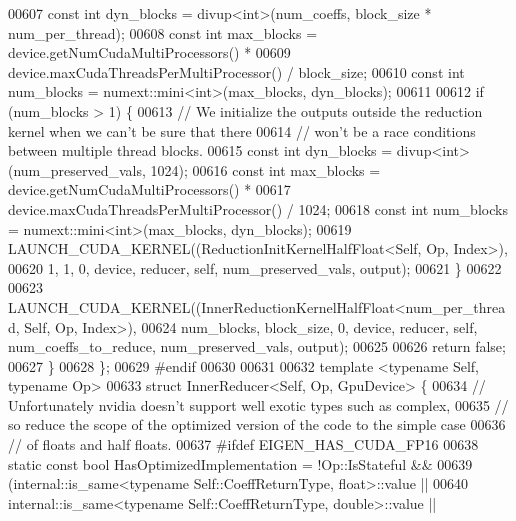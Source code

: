 \begin{DoxyCode}
00607     \textcolor{keyword}{const} \textcolor{keywordtype}{int} dyn\_blocks = divup<int>(num\_coeffs, block\_size * num\_per\_thread);
00608     \textcolor{keyword}{const} \textcolor{keywordtype}{int} max\_blocks = device.getNumCudaMultiProcessors() *
00609                            device.maxCudaThreadsPerMultiProcessor() / block\_size;
00610     \textcolor{keyword}{const} \textcolor{keywordtype}{int} num\_blocks = numext::mini<int>(max\_blocks, dyn\_blocks);
00611 
00612     \textcolor{keywordflow}{if} (num\_blocks > 1) \{
00613       \textcolor{comment}{// We initialize the outputs outside the reduction kernel when we can't be sure that there}
00614       \textcolor{comment}{// won't be a race conditions between multiple thread blocks.}
00615       \textcolor{keyword}{const} \textcolor{keywordtype}{int} dyn\_blocks = divup<int>(num\_preserved\_vals, 1024);
00616       \textcolor{keyword}{const} \textcolor{keywordtype}{int} max\_blocks = device.getNumCudaMultiProcessors() *
00617                            device.maxCudaThreadsPerMultiProcessor() / 1024;
00618       \textcolor{keyword}{const} \textcolor{keywordtype}{int} num\_blocks = numext::mini<int>(max\_blocks, dyn\_blocks);
00619       LAUNCH\_CUDA\_KERNEL((ReductionInitKernelHalfFloat<Self, Op, Index>),
00620                          1, 1, 0, device, reducer, \textcolor{keyword}{self}, num\_preserved\_vals, output);
00621     \}
00622 
00623     LAUNCH\_CUDA\_KERNEL((InnerReductionKernelHalfFloat<num\_per\_thread, Self, Op, Index>),
00624                        num\_blocks, block\_size, 0, device, reducer, \textcolor{keyword}{self}, num\_coeffs\_to\_reduce, 
      num\_preserved\_vals, output);
00625 
00626     \textcolor{keywordflow}{return} \textcolor{keyword}{false};
00627   \}
00628 \};
00629 \textcolor{preprocessor}{#endif}
00630 
00631 
00632 \textcolor{keyword}{template} <\textcolor{keyword}{typename} Self, \textcolor{keyword}{typename} Op>
00633 \textcolor{keyword}{struct }InnerReducer<Self, Op, GpuDevice> \{
00634   \textcolor{comment}{// Unfortunately nvidia doesn't support well exotic types such as complex,}
00635   \textcolor{comment}{// so reduce the scope of the optimized version of the code to the simple case}
00636   \textcolor{comment}{// of floats and half floats.}
00637 \textcolor{preprocessor}{#ifdef EIGEN\_HAS\_CUDA\_FP16}
00638   \textcolor{keyword}{static} \textcolor{keyword}{const} \textcolor{keywordtype}{bool} HasOptimizedImplementation = !Op::IsStateful &&
00639       (internal::is\_same<typename Self::CoeffReturnType, float>::value ||
00640        internal::is\_same<typename Self::CoeffReturnType, double>::value ||

\end{DoxyCode}
